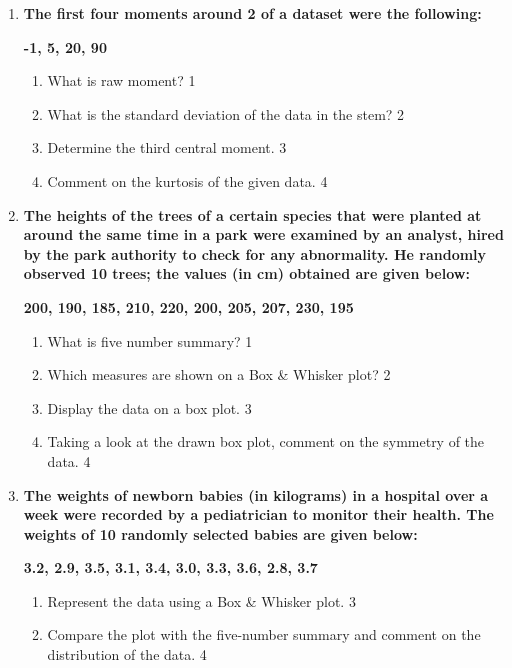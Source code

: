\documentclass[a4paper,oneside]{book}
\begin{document}
\begin{enumerate}
   \item
	  \textbf{The first four moments around 2 of a dataset were the following:}
	  
	  \begin{center}
	  \textbf{-1, 5, 20, 90}
	  \end{center}
  
  \begin{enumerate}
    \item
	What is raw moment? \hfill 1
    \item
	What is the standard deviation of the data in the stem? \hfill 2
    \item  
	Determine the third central moment. \hfill 3
    \item
	Comment on the kurtosis of the given data. \hfill 4
  \end{enumerate}
  
     \item
	  \textbf{The heights of the trees of a certain species that were planted at around the same time in a park were examined by an analyst, hired by the park authority to check for any abnormality. He randomly observed 10 trees; the values (in cm) obtained are given below:} 
	  
	  	  \begin{center}
	  \textbf{200, 190, 185, 210, 220, 200, 205, 207, 230, 195}
	  \end{center}
  
  \begin{enumerate}
    \item
	What is five number summary? \hfill 1
    \item
	Which measures are shown on a Box \& Whisker plot? \hfill 2
    \item  
	Display the data on a box plot. \hfill 3
    \item
	Taking a look at the drawn box plot, comment on the symmetry of the data. \hfill 4
  \end{enumerate}
  
  \item
\textbf{The weights of newborn babies (in kilograms) in a hospital over a week were recorded by a pediatrician to monitor their health. The weights of 10 randomly selected babies are given below:}

\begin{center}
\textbf{3.2, 2.9, 3.5, 3.1, 3.4, 3.0, 3.3, 3.6, 2.8, 3.7}
\end{center}

\begin{enumerate}
    \item  
    Represent the data using a Box \& Whisker plot. \hfill 3
    \item
    Compare the plot with the five-number summary and comment on the distribution of the data. \hfill 4
\end{enumerate}



\end{enumerate}
\end{document}
